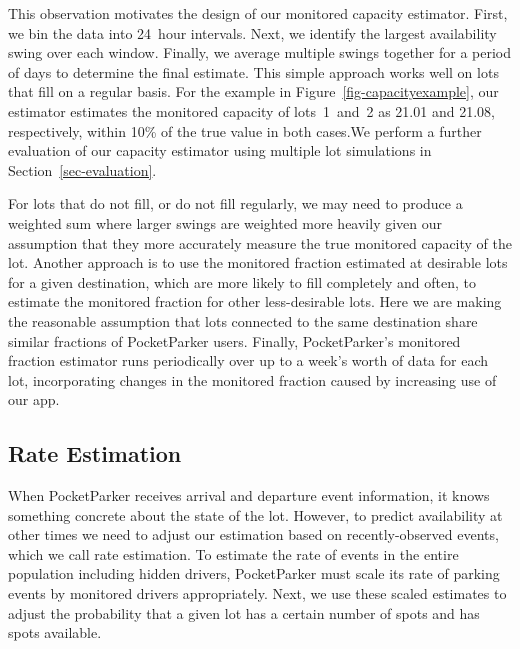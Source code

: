 This observation motivates the design of our monitored capacity estimator.
First, we bin the data into 24~hour intervals. Next, we identify the largest
availability swing over each window. Finally, we average multiple swings
together for a period of days to determine the final estimate. This simple
approach works well on lots that fill on a regular basis. For the example in
Figure~\ref{fig-capacityexample}, our estimator estimates the monitored
capacity of lots~1~and~2 as 21.01 and 21.08, respectively, within 10\% of the
true value in both cases.We perform a further evaluation of our capacity
estimator using multiple lot simulations in Section~\ref{sec-evaluation}.

For lots that do not fill, or do not fill regularly, we may need to produce a
weighted sum where larger swings are weighted more heavily given our
assumption that they more accurately measure the true monitored capacity of
the lot. Another approach is to use the monitored fraction estimated at
desirable lots for a given destination, which are more likely to fill
completely and often, to estimate the monitored fraction for other
less-desirable lots. Here we are making the reasonable assumption that lots
connected to the same destination share similar fractions of PocketParker
users. Finally, PocketParker's monitored fraction estimator runs periodically
over up to a week's worth of data for each lot, incorporating changes in the
monitored fraction caused by increasing use of our app.

\subsection{Rate Estimation}
\label{subsec-rates}

When PocketParker receives arrival and departure event information, it knows
something concrete about the state of the lot. However, to predict
availability at other times we need to adjust our estimation based on
recently-observed events, which we call rate estimation. To estimate the rate
of events in the entire population including hidden drivers, PocketParker
must scale its rate of parking events by monitored drivers appropriately.
Next, we use these scaled estimates to adjust the probability that a given
lot has a certain number of spots and has spots available.

